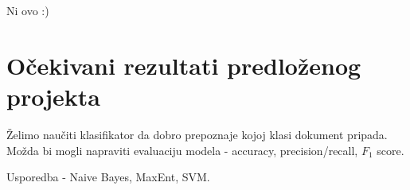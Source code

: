 \documentclass[12pt,a4paper,titlepage]{article}
\begin{document}
Ni ovo :)

\section{Očekivani rezultati predloženog projekta}

Želimo naučiti klasifikator da dobro prepoznaje kojoj klasi dokument pripada. Možda bi mogli napraviti evaluaciju modela - accuracy, precision/recall, $F_1$ score.

Usporedba - Naive Bayes, MaxEnt, SVM.

\newpage

\nocite{Pang:2002:TUS:1118693.1118704}
\nocite{bird2009natural}



\end{document}
